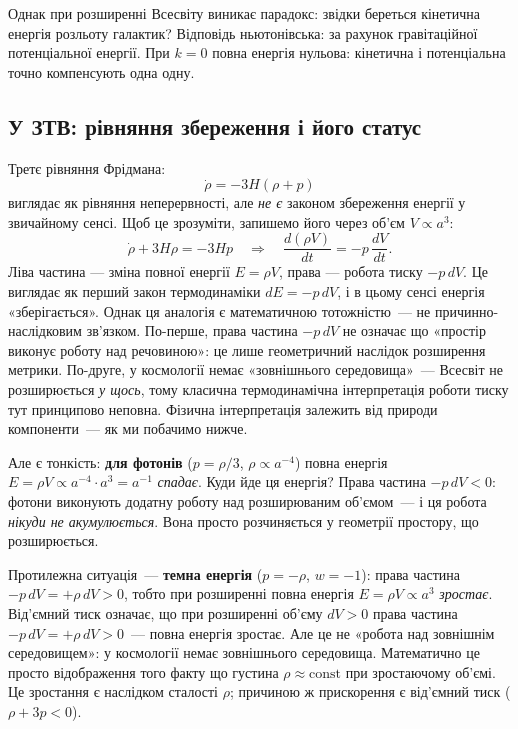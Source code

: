 Однак при розширенні Всесвіту виникає парадокс: звідки береться
кінетична енергія розльоту галактик? Відповідь ньютонівська:
за рахунок гравітаційної потенціальної енергії.
При $k = 0$ повна енергія нульова: кінетична і потенціальна
точно компенсують одна одну.

\subsection*{У ЗТВ: рівняння збереження і його статус}

Третє рівняння Фрідмана:
\[
  \dot\rho = -3H(\rho + p)
\]
виглядає як рівняння неперервності, але \emph{не є} законом
збереження енергії у звичайному сенсі. Щоб це зрозуміти,
запишемо його через об'єм $V \propto a^3$:
\[
  \dot\rho + 3H\rho = -3Hp \quad\Rightarrow\quad
  \frac{d(\rho V)}{dt} = -p\,\frac{dV}{dt}.
\]
Ліва частина --- зміна повної енергії $E = \rho V$,
права --- робота тиску $-p\,dV$.
Це виглядає як перший закон термодинаміки $dE = -p\,dV$,
і в цьому сенсі енергія «зберігається». Однак ця аналогія
є математичною тотожністю~--- не причинно-наслідковим
зв'язком. По-перше, права частина $-p\,dV$ не означає що
«простір виконує роботу над речовиною»: це лише геометричний
наслідок розширення метрики. По-друге, у космології немає
«зовнішнього середовища»~--- Всесвіт не розширюється
\emph{у щось}, тому класична термодинамічна інтерпретація
роботи тиску тут принципово неповна. Фізична інтерпретація
залежить від природи компоненти~--- як ми побачимо нижче.

Але є тонкість: \textbf{для фотонів} ($p = \rho/3$,
$\rho \propto a^{-4}$) повна енергія
$E = \rho V \propto a^{-4} \cdot a^3 = a^{-1}$
\emph{спадає}. Куди йде ця енергія? Права частина
$-p\,dV < 0$: фотони виконують додатну роботу над
розширюваним об'ємом~--- і ця робота \emph{нікуди
не акумулюється}. Вона просто розчиняється у геометрії
простору, що розширюється.

Протилежна ситуація~--- \textbf{темна енергія}
($p = -\rho$, $w = -1$): права частина
$-p\,dV = +\rho\,dV > 0$, тобто при розширенні
повна енергія $E = \rho V \propto a^3$ \emph{зростає}.
Від'ємний тиск означає, що при розширенні об'єму
$dV > 0$ права частина $-p\,dV = +\rho\,dV > 0$~---
повна енергія зростає. Але це не «робота над зовнішнім
середовищем»: у космології немає зовнішнього середовища.
Математично це просто відображення того факту що
густина $\rho \approx \text{const}$ при зростаючому
об'ємі. Це зростання є наслідком сталості $\rho$; причиною ж прискорення
є від'ємний тиск ($\rho+3p<0$).

